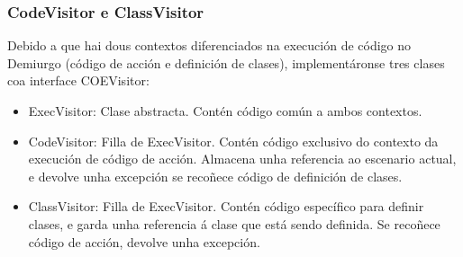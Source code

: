 \subsubsection{CodeVisitor e ClassVisitor}
Debido a que hai dous contextos diferenciados na execución de código no
Demiurgo (código de acción e definición de clases), implementáronse tres clases
coa interface COEVisitor:
\begin{itemize}
  \item ExecVisitor: Clase abstracta. Contén código común a ambos contextos.
  \item CodeVisitor: Filla de ExecVisitor. Contén código exclusivo do contexto
  da execución de código de acción. Almacena unha referencia ao escenario
  actual, e devolve unha excepción se recoñece código de definición de clases.
  \item ClassVisitor: Filla de ExecVisitor. Contén código específico para
  definir clases, e garda unha referencia á clase que está sendo definida. Se
  recoñece código de acción, devolve unha excepción.
\end{itemize}

